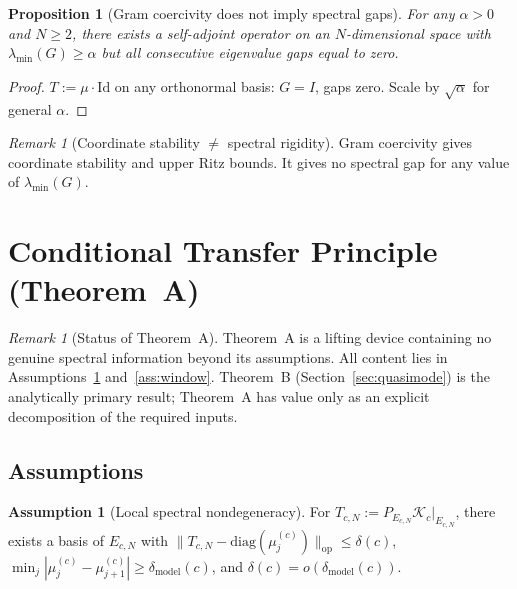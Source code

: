 \documentclass[12pt,a4paper]{amsart}
\newtheorem{proposition}[theorem]{Proposition}
\theoremstyle{definition}
\newtheorem{assumption}[theorem]{Assumption}
\theoremstyle{remark}
\newtheorem{remark}[theorem]{Remark}
\newcommand{\Kc}{\mathcal{K}_c}
\newcommand{\op}{\mathrm{op}}
\begin{document}
\begin{proposition}[Gram coercivity does not imply spectral gaps]
\label{prop:gram-fails}
For any $\alpha > 0$ and $N \geq 2$, there exists a self-adjoint
operator on an $N$-dimensional space with $\lambda_{\min}(G) \geq \alpha$
but all consecutive eigenvalue gaps equal to zero.
\end{proposition}

\begin{proof}
$T := \mu \cdot \mathrm{Id}$ on any orthonormal basis:
$G = I$, gaps zero. Scale by $\sqrt{\alpha}$ for general $\alpha$.
\end{proof}

\begin{remark}[Coordinate stability $\neq$ spectral rigidity]
\label{rem:gram-limit}
Gram coercivity gives coordinate stability and upper Ritz bounds.
It gives no spectral gap for any value of $\lambda_{\min}(G)$.
\end{remark}

\section{Conditional Transfer Principle (Theorem~A)}
\label{sec:transfer}

\begin{remark}[Status of Theorem~A]
\label{rem:thmA-status}
Theorem~A is a lifting device containing no genuine spectral
information beyond its assumptions.
All content lies in Assumptions~\ref{ass:nondeg} and~\ref{ass:window}.
Theorem~B (Section~\ref{sec:quasimode}) is the analytically primary
result; Theorem~A has value only as an explicit decomposition of
the required inputs.
\end{remark}

\subsection{Assumptions}

\begin{assumption}[Local spectral nondegeneracy]
\label{ass:nondeg}
For $T_{c,N} := P_{E_{c,N}}\Kc|_{E_{c,N}}$, there exists a basis of
$E_{c,N}$ with
$\|T_{c,N} - \mathrm{diag}(\mu_j^{(c)})\|_{\op} \leq \delta(c)$,
$\min_j|\mu_j^{(c)} - \mu_{j+1}^{(c)}| \geq \delta_{\mathrm{model}}(c)$,
and $\delta(c) = o(\delta_{\mathrm{model}}(c))$.
\end{assumption}
\end{document}
